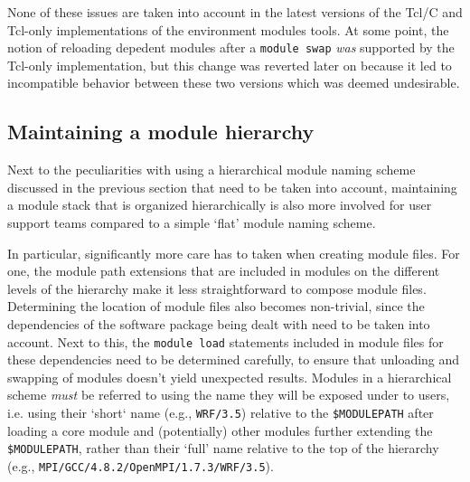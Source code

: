 None of these issues are taken into account in the latest versions of the
Tcl/C and Tcl-only implementations of the environment modules tools. At some point,
the notion of reloading depedent modules after a \texttt{\small module swap}
\emph{was} supported by the Tcl-only implementation, but this change was
reverted later on because it led to incompatible behavior between
these two versions which was deemed undesirable.




\subsection{Maintaining a module hierarchy}
\label{sec:maintaining_a_hierarchy}

Next to the peculiarities with using a hierarchical module naming scheme discussed in
the previous section that need to be taken into account, maintaining a module stack
that is organized hierarchically is also more involved for user support teams
compared to a simple `flat' module naming scheme.

In particular, significantly more care has to taken when creating
module files. For one, the module path extensions that are included in modules
on the different levels of the hierarchy make it less straightforward to compose
module files. Determining the location of module files also becomes
non-trivial, since the dependencies of the software package being dealt with need
to be taken into account. Next to this, the \texttt{\small module load} statements
included in module files for these dependencies need to be determined carefully, to
ensure that unloading and swapping of modules doesn't yield unexpected results.
Modules in a hierarchical scheme \emph{must} be referred to using the name they will 
be exposed under to users, i.e. using their `short` name (e.g.,
\texttt{\small WRF/3.5}) relative to the \texttt{\small \$MODULEPATH} after loading
a core module and (potentially) other modules further extending the \texttt{\small
\$MODULEPATH}, rather than their `full' name relative to the top of the hierarchy
(e.g., \texttt{\small MPI/GCC/4.8.2/OpenMPI/1.7.3/WRF/3.5}).

